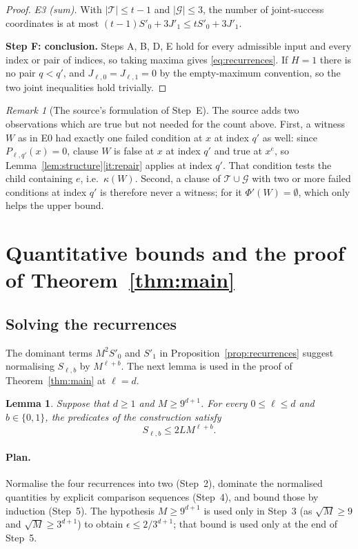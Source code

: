 \documentclass[11pt]{article}
\newtheorem{lemma}[theorem]{Lemma}
\theoremstyle{definition}
\theoremstyle{remark}
\newtheorem{remark}[theorem]{Remark}
\begin{document}
\begin{proof}
\emph{E3 (sum).} With \(|\mathcal T|\le t-1\) and \(|\mathcal G|\le3\), the
number of joint-success coordinates is at most
\((t-1)S'_0+3J'_1\le tS'_0+3J'_1\).

\medskip\noindent\textbf{Step F: conclusion.}
Steps A, B, D, E hold for every admissible input and every index or pair of
indices, so taking maxima gives \eqref{eq:recurrences}. If \(H=1\) there is
no pair \(q<q'\), and \(J_{\ell,0}=J_{\ell,1}=0\) by the empty-maximum
convention, so the two joint inequalities hold trivially.
\end{proof}

\begin{remark}[The source's formulation of Step~E]
The source adds two observations which are true but not needed for the
count above. First, a witness \(W\) as in E0 had exactly one failed
condition at \(x\) at index \(q'\) as well: since \(P_{\ell,q'}(x)=0\),
clause \(W\) is false at \(x\) at index \(q'\) and true at \(x^e\), so
Lemma~\ref{lem:structure}\ref{it:repair} applies at index \(q'\). That
condition tests the child containing \(e\), i.e.\ \(\kappa(W)\). Second, a
clause of \(\mathcal T\cup\mathcal G\) with two or more failed conditions at
index \(q'\) is therefore never a witness; for it \(\Phi'(W)=\emptyset\),
which only helps the upper bound.
\end{remark}

\section{Quantitative bounds and the proof of Theorem~\ref{thm:main}}
\label{sec:separation}

\subsection{Solving the recurrences}

The dominant terms \(M^2S'_0\) and \(S'_1\) in
Proposition~\ref{prop:recurrences} suggest normalising \(S_{\ell,b}\) by
\(M^{\ell+b}\). The next lemma is used in the proof of
Theorem~\ref{thm:main} at \(\ell=d\).

\begin{lemma}
\label{lem:quantitative-profiles}
Suppose that \(d\geq 1\) and \(M\geq 9^{d+1}\).
For every \(0\leq\ell\leq d\) and \(b\in\{0,1\}\), the predicates of the
construction satisfy
\[
  S_{\ell,b}\leq 2L M^{\ell+b}.
\]
\end{lemma}

\paragraph{Plan.}
Normalise the four recurrences into two (Step~2), dominate the normalised
quantities by explicit comparison sequences (Step~4), and bound those by
induction (Step~5). The hypothesis \(M\ge9^{d+1}\) is used only in Step~3
(as \(\sqrt M\ge9\) and \(\sqrt M\ge3^{d+1}\)) to obtain
\(\epsilon\le2/3^{d+1}\); that bound is used only at the end of Step~5.
\end{document}
